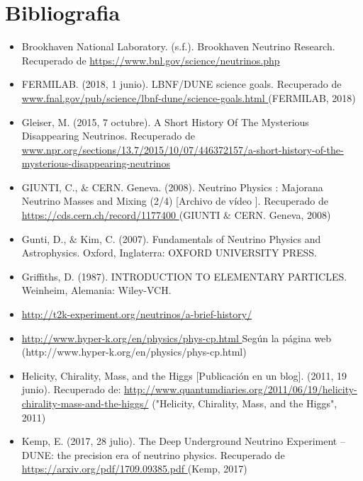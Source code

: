 \documentclass[paper=a4paper, fontsize=12pt]{scrartcl} %
\numberwithin{equation}{section} %
\numberwithin{figure}{section} %
\numberwithin{table}{section} %
\begin{document}
\section{Bibliografia}
\begin{itemize}
\item Brookhaven National Laboratory. (s.f.). Brookhaven Neutrino Research. Recuperado de   \url{https://www.bnl.gov/science/neutrinos.php }

\item FERMILAB. (2018, 1 junio). LBNF/DUNE science goals. Recuperado de  \url{www.fnal.gov/pub/science/lbnf-dune/science-goals.html } (FERMILAB, 2018)


\item Gleiser, M. (2015, 7 octubre). A Short History Of The Mysterious Disappearing Neutrinos.  Recuperado de
\newline 
\url{www.npr.org/sections/13.7/2015/10/07/446372157/a-short-history-of-the-mysterious-disappearing-neutrinos } 

\item GIUNTI, C., $\&$ CERN. Geneva. (2008). Neutrino Physics : Majorana Neutrino Masses and Mixing (2/4) [Archivo de vídeo ]. Recuperado de  \url{https://cds.cern.ch/record/1177400 }
(GIUNTI $\&$ CERN. Geneva, 2008)

\item Gunti, D., $\&$  Kim, C. (2007). Fundamentals of Neutrino Physics and Astrophysics. Oxford, Inglaterra: OXFORD UNIVERSITY PRESS.

\item Griffiths, D. (1987). INTRODUCTION TO ELEMENTARY PARTICLES. Weinheim, Alemania: Wiley-VCH.

\item  \url{http://t2k-experiment.org/neutrinos/a-brief-history/ }

\item  \url{http://www.hyper-k.org/en/physics/phys-cp.html }
Según la página web (http://www.hyper-k.org/en/physics/phys-cp.html)


\item Helicity, Chirality, Mass, and the Higgs [Publicación en un blog]. (2011, 19 junio). Recuperado de:
\newline
  \url{http://www.quantumdiaries.org/2011/06/19/helicity-chirality-mass-and-the-higgs/} ("Helicity, Chirality, Mass, and the Higgs", 2011)
 

\item Kemp, E. (2017, 28 julio). The Deep Underground Neutrino Experiment – DUNE: the precision era of neutrino physics. Recuperado de  \url{https://arxiv.org/pdf/1709.09385.pdf } (Kemp, 2017)


\end{itemize}
\end{document}
